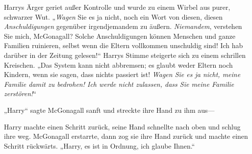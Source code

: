 Harrys Ärger geriet außer Kontrolle und wurde zu einem Wirbel aus purer, schwarzer Wut. „\emph{Wagen} Sie es ja nicht, noch ein Wort von diesen, diesen \emph{Anschuldigungen} gegenüber irgendjemandem zu äußern. \emph{Niemandem}, verstehen Sie mich, McGonagall? Solche Anschuldigungen können Menschen und ganze Familien ruinieren, selbst wenn die Eltern vollkommen unschuldig sind! Ich hab darüber in der Zeitung gelesen!“ Harrys Stimme steigerte sich zu einem schrillen Kreischen. „Das System kann nicht abbremsen; es glaubt weder Eltern noch Kindern, wenn sie sagen, dass nichts passiert ist! \emph{Wagen Sie es ja nicht, meine Familie damit zu bedrohen! Ich werde nicht zulassen, dass Sie meine Familie zerstören!}“

„Harry“ sagte McGonagall sanft und streckte ihre Hand zu ihm aus—

Harry machte einen Schritt zurück, seine Hand schnellte nach oben und schlug ihre weg. McGonagall erstarrte, dann zog sie ihre Hand zurück und machte einen Schritt rückwärts. „Harry, es ist in Ordnung, ich glaube Ihnen.“

